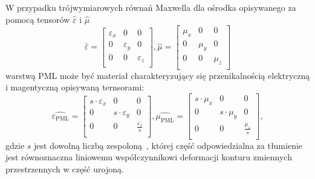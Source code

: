 W przypadku trójwymiarowych równań Maxwella dla ośrodka opisywanego za pomocą tensorów $\hat{\varepsilon}$ i $\hat{\mu}$ 
\begin{equation}
\hat{\varepsilon}=
\begin{bmatrix}
\varepsilon_x & 0 & 0 \\
0 &\varepsilon_y & 0 \\
0 & 0  & \varepsilon_z  \\
\end{bmatrix}
, \hat{\mu}=
\begin{bmatrix}
\mu_x & 0 & 0 \\
0 &\mu_y & 0 \\
0 & 0  & \mu_z  \\
\end{bmatrix}
\end{equation}
warstwą PML może być materiał charakteryzujący się przenikalnością elektryczną i magentyczną opisywaną ternsorami:
\begin{equation}
\hat{\varepsilon_{\textrm{PML}}}=
\begin{bmatrix}
s \cdot \varepsilon_x & 0 & 0 \\
0 &s \cdot \varepsilon_y & 0 \\
0 & 0  & \frac{ \varepsilon_z}{s}  \\
\end{bmatrix}
, \hat{\mu_{\textrm{PML}}}=
\begin{bmatrix}
s \cdot \mu_x & 0 & 0 \\
0 & s \cdot \mu_y & 0 \\
0 & 0  & \frac{\mu_z}{s}  \\
\end{bmatrix},
\label{eq:general-pml-form}
\end{equation}
gdzie $s$ jest dowolną liczbą zespoloną~\cite{sacks1995perfectly}, której część odpowiedzialna za tłumienie jest równoznaczna liniowemu współczynnikowi deformacji konturu zmiennych przestrzennych w część urojoną.


